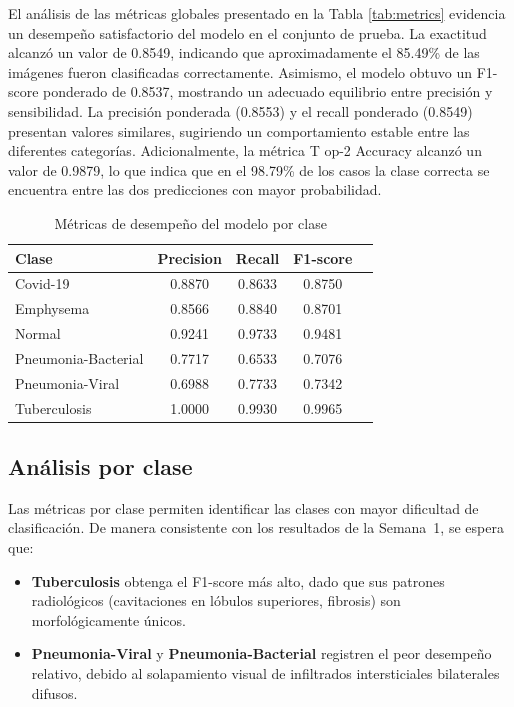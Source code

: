 \documentclass[10pt,twocolumn]{article}
\begin{document}
El análisis de las métricas globales presentado en la Tabla \ref{tab:metrics} evidencia un 
desempeño satisfactorio del modelo en el conjunto de prueba. La exactitud alcanzó un 
valor de 0.8549, indicando que aproximadamente el 85.49\% de las imágenes fueron 
clasificadas correctamente. Asimismo, el modelo obtuvo un F1-score ponderado de 
0.8537, mostrando un adecuado equilibrio entre precisión y sensibilidad. La precisión 
ponderada (0.8553) y el recall ponderado (0.8549) presentan valores similares, sugiriendo 
un comportamiento estable entre las diferentes categorías. Adicionalmente, la métrica T
op-2 Accuracy alcanzó un valor de 0.9879, lo que indica que en el 98.79\% de los casos 
la clase correcta se encuentra entre las dos predicciones con mayor probabilidad. 

\begin{table}[H]
\centering
\caption{Métricas de desempeño del modelo por clase}
\label{tab:metricas_clases}

\small
\begin{tabular}{p{3cm}cccc}
\hline
\textbf{Clase} & \textbf{Precision} & \textbf{Recall} & \textbf{F1-score}\\
\hline
Covid-19             & 0.8870 & 0.8633 & 0.8750 \\
Emphysema            & 0.8566 & 0.8840 & 0.8701 \\
Normal               & 0.9241 & 0.9733 & 0.9481 \\
Pneumonia-Bacterial  & 0.7717 & 0.6533 & 0.7076 \\
Pneumonia-Viral      & 0.6988 & 0.7733 & 0.7342 \\
Tuberculosis         & 1.0000 & 0.9930 & 0.9965 \\
\hline
\end{tabular}

\end{table}

\subsection{Análisis por clase}

Las métricas por clase permiten identificar las clases con mayor
dificultad de clasificación.  De manera consistente con los resultados
de la Semana~1, se espera que:

\begin{itemize}[leftmargin=*,noitemsep,topsep=2pt]
  \item \textbf{Tuberculosis} obtenga el F1-score más alto, dado que
        sus patrones radiológicos (cavitaciones en lóbulos superiores,
        fibrosis) son morfológicamente únicos.
  \item \textbf{Pneumonia-Viral} y \textbf{Pneumonia-Bacterial}
        registren el peor desempeño relativo, debido al solapamiento
        visual de infiltrados intersticiales bilaterales difusos.
\end{itemize}
\end{document}
